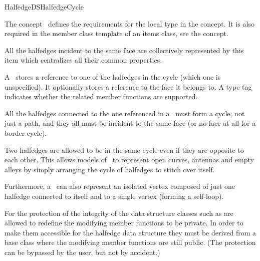
\ccRefPageBegin



\begin{ccRefConcept}{HalfedgeDSHalfedgeCycle}
\label{pageHalfedgeDSItemsHalfedgeCycleRef}


\ccDefinition
  
The concept \ccRefName\ defines the requirements for the local  
type in the  concept. It is also required in 
the  member class template of an
items class, see the  concept.

All the halfedges incident to the same face are collectively represented
by this \ccRefName\  item which centralizes all their common properties.

A \ccRefName\ stores a reference to one of the halfedges in the cycle (which one is unspecified).
It optionally stores a reference to the face it belongs to. A type tag indicates whether 
the related member functions are supported. 

All the halfedges connected to the one referenced in a \ccRefName\ must form a cycle, not just a path, and they all must be incident to the same face (or no face at all for a border cycle).

Two halfedges are allowed to be in the same cycle even if they are opposite to each other. 
This allows models of \ccRefName\ to represent open curves, antennas and empty alleys by simply arranging 
the cycle of halfedges to stitch over itself. 

Furthermore, a \ccRefName\ can also represent an isolated vertex composed of just one halfedge
connected to itself and to a single vertex (forming a self-loop).

For the protection of the integrity of the data structure classes such as
 are allowed to redefine the modifying member 
functions to be private. In order to make them accessible for the 
halfedge data structure they must be derived from a base class 
where the modifying member functions are still public. (The protection
can be bypassed by the user, but not by accident.)


\end{ccRefConcept}
